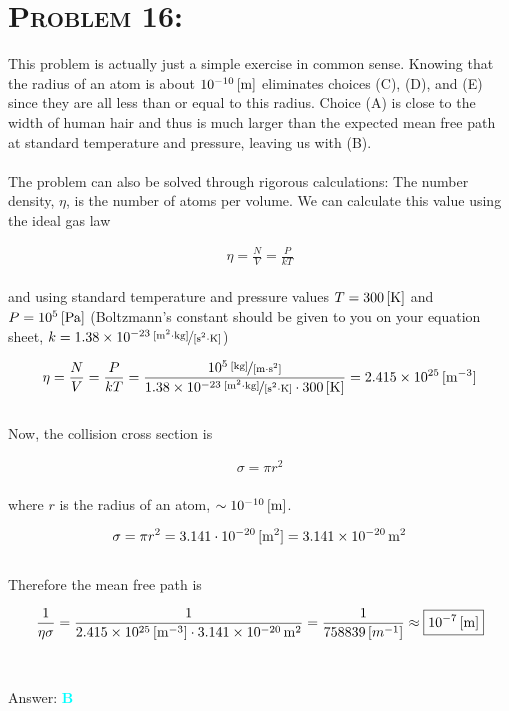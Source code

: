 \documentclass{article}
\providecommand{\e}[1]{\ensuremath{\times 10^{#1}}}
\begin{document}

\section{\textsc{Problem 16:}} This problem is actually just a simple exercise in common sense. Knowing that the radius of an atom is about $\unit[10^{-10}]{[m]}$ eliminates choices (C), (D), and (E) since they are all less than or equal to this radius. Choice (A) is close to the width of human hair and thus is much larger than the expected mean free path at standard temperature and pressure, leaving us with (B).\\
\\
The problem can also be solved through rigorous calculations: The number density, $\eta$, is the number of atoms per volume. We can calculate this value using the ideal gas law

\begin{gather}
\eta = \frac{N}{V} = \frac{P}{kT}
\end{gather}
\\
and using standard temperature and pressure values $T = \unit[300]{[K]}$ and $P = \unit[10^{5}]{[Pa]}$ (Boltzmann's constant should be given to you on your equation sheet, $k = \unitfrac[1.38\e{-23}]{[m^{2} \cdot kg]}{[s^{2} \cdot K]}$)

\begin{gather}
\eta = \frac{N}{V} = \frac{P}{kT} = \frac{\unitfrac[10^{5}]{[kg]} { [m\cdot s^{2} ]}}{\unitfrac[1.38\e{-23}]{[m^{2} \cdot kg]}{[s^{2} \cdot K]} \cdot \unit[300]{[K]}} = \unit[2.415\e{25}]{[m^{-3}]}\nonumber
\end{gather}
\\
Now, the collision cross section is 

\begin{gather}
\sigma = \pi r^{2}
\end{gather}
\\
where $r$ is the radius of an atom, $\sim \unit[10^{-10}]{[m]}$. 

\begin{gather}
\sigma = \pi r^{2} = 3.141 \cdot \unit[10^{-20}]{[m^{2}]} = \unit[3.141\e{-20}]{{m^{2}}}\nonumber
\end{gather}
\\
Therefore the mean free path is

\begin{gather}
\frac{1}{\eta \sigma } = \frac{1}{\unit[2.415\e{25}]{[m^{-3}]} \cdot \unit[3.141\e{-20}]{{m^{2}}} } = \frac{1}{\unit[758839][{m^{-1}}]} \approx \boxed{\unit[10^{-7}]{[m]}}\nonumber
\end{gather}
\\\\
Answer: \textbf{\textcolor{cyan}B}\\
\end{document}
